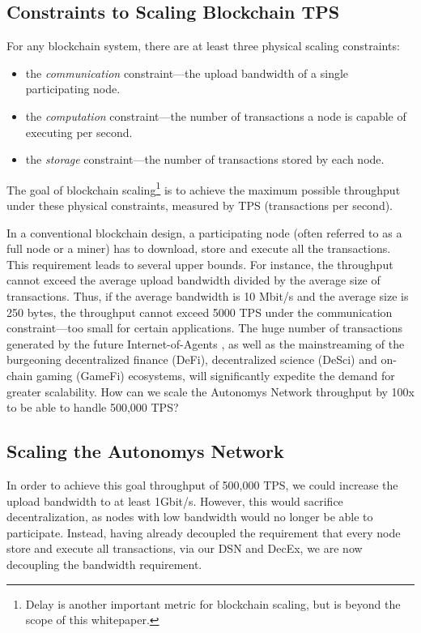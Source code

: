\documentclass[conference]{IEEEtran}
\begin{document}
\subsection{Constraints to Scaling Blockchain TPS}

For any blockchain system, there are at least three physical scaling constraints:
\begin{itemize}
    \item the \textit{communication} constraint—the upload bandwidth of a single participating node.
    \item the \textit{computation} constraint—the number of transactions a node is capable of executing per second.
    \item the \textit{storage} constraint—the number of transactions stored by each node.
\end{itemize}
The goal of blockchain scaling\footnote{Delay is another important metric for blockchain scaling, but is beyond the scope of this whitepaper.} is to achieve the maximum possible throughput under these physical constraints, measured by TPS (transactions per second).

In a conventional blockchain design, a participating node (often referred to as a full node or a miner) has to download, store and execute all the transactions. This requirement leads to several upper bounds. For instance, the throughput cannot exceed the average upload bandwidth divided by the average size of transactions. Thus, if the average bandwidth is 10 Mbit/s and the average size is 250 bytes, the throughput cannot exceed 5000 TPS under the communication constraint—too small for certain applications. The huge number of transactions generated by the future Internet-of-Agents \cite{ioa}, as well as the mainstreaming of the burgeoning decentralized finance (DeFi), decentralized science (DeSci) and on-chain gaming (GameFi) ecosystems, will significantly expedite the demand for greater scalability. How can we scale the Autonomys Network throughput by 100x to be able to handle 500,000 TPS?

\subsection{Scaling the Autonomys Network}

In order to achieve this goal throughput of 500,000 TPS, we could increase the upload bandwidth to at least 1Gbit/s. However, this would sacrifice decentralization, as nodes with low bandwidth would no longer be able to participate. Instead, having already decoupled the requirement that every node store and execute all transactions, via our DSN and DecEx, we are now decoupling the bandwidth requirement.
\end{document}

